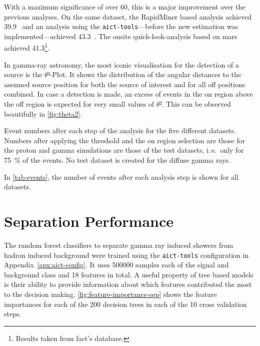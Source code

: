 With a maximum significance of over \SI{60}{\sigma}, this is a major improvement over the 
previous analyses. 
On the same dataset, the RapidMiner based analysis achieved \SI{39.9}{\sigma}~\cite[72]{phd-temme}
and an analysis using the \texttt{aict-tools}—before the
new  estimation was implemented—achieved \SI{43.3}{\sigma}~\cite{icrc-performance}.
The onsite quick-look-analysis based on \gls{mars} achieved \SI{41.3}{\sigma}\footnote{Results taken from \gls{fact}'s database.}.

In gamma-ray astronomy, the most iconic visualisation for the detection of a source
is the $θ²$-Plot. 
It shows the distribution of the angular distances to the assumed source position
for both the source of interest and for all off positions combined.
In case a detection is made, an excess of events in the on region above the off
region is expected for very small values of $θ²$.
This can be observed beautifully in \autoref{fig:theta2}.

\begin{table}[htpb]
  \tablefont
  \centering
  \caption{
    Event numbers after each step of the analysis for the five different datasets.
    Numbers after applying the threshold and the on region selection are those for
    the proton and gamma simulations are those of the test datasets, i.\,e.\ only for \SI{75}{\percent} 
    of the events.
    No test dataset is created for the diffuse gamma rays.
  }
  \label{tab:events}
  \makebox[\textwidth]{%
    
  }
\end{table}

In \autoref{tab:events}, the number of events after each analysis step is shown
for all datasets.

\section{Separation Performance}

The random forest classifiers to separate gamma ray induced showers from
hadron induced background were trained using the \texttt{aict-tools} configuration
in Appendix~\ref{apx:aict-config}.
It uses \num{500000} samples each of the signal and background class and 18 features
in total.
A useful property of tree based models is their ability to provide information 
about which features contributed the most to the decision making.
\autoref{fig:feature-importance-sep} shows the feature importances for each
of the 200 decision trees in each of the 10 cross validation steps.


